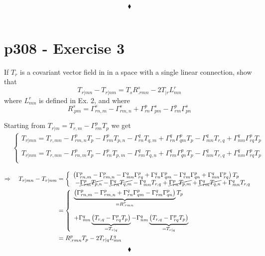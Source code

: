 $$\blacklozenge$$\\
\newpage


\section{p308 - Exercise 3}
\begin{tcolorbox}
If $T_r$ is a covariant vector field in in a space with a single linear connection, show that
 $$ T_{r|mn} - T_{r|nm} = T_s R^s_{.rmn}-2 T_{|r} L^r_{mn}$$
 where $ L^r_{mn}$ is defined in Ex. $2$, and where 
 $$R^s_{.pm} = \Gamma^s_{rn,m} - \Gamma^s_{rm,n} + \Gamma^p_{rn}\Gamma^s_{pm}-\Gamma^p_{rm}\Gamma^s_{pn}$$
\end{tcolorbox}
Starting from $ T_{r|m} = T_{r,m} - \Gamma^p_{rm}T_p$ we get
\begin{align}
&\left\{\begin{array}{l}
T_{r|mn} = T_{r,mn} - \Gamma^p_{rm,n}T_p- \Gamma^p_{rm}T_{p,n} - \Gamma^q_{rn}T_{q,m} + \Gamma^q_{rn}\Gamma^p_{qm}T_{p} - \Gamma^q_{mn}T_{r,q} +  \Gamma^q_{mn}\Gamma^p_{rq}T_{p} \\\\
T_{r|nm} = T_{r,mn} - \Gamma^p_{rn,m}T_p- \Gamma^p_{rn}T_{p,m} - \Gamma^q_{rm}T_{q,n} + \Gamma^q_{rm}\Gamma^p_{qn}T_{p} - \Gamma^q_{nm}T_{r,q} +  \Gamma^q_{nm}\Gamma^p_{rq}T_{p} \\
\end{array}
\right.
\end{align}

\begin{align}
\Rightarrow\quad T_{r|mn} -T_{r|nm} &= \left\{\begin{array}{l}
 \left(\Gamma^p_{rn,m} - \Gamma^p_{rm,n} 
- \Gamma^q_{mn}\Gamma^p_{rq}+ \Gamma^q_{rn}\Gamma^p_{qm}- \Gamma^q_{rm}\Gamma^p_{qn}+  \Gamma^q_{mn}\Gamma^p_{rq}\right)T_p\\\
- \cancel{\Gamma^p_{rm}T_{p,n}} - \cancel{\Gamma^q_{rn}T_{q,m}}  - \Gamma^q_{mn}T_{r,q}   +  \cancel{\Gamma^p_{rn}T_{p,m}} + \cancel{\Gamma^q_{rm}T_{q,n}} + \Gamma^q_{mn}T_{r,q}  \\
\end{array}
\right.\\
&=  \left\{\begin{array}{l}
 \underbrace{\left(\Gamma^p_{rn,m} - \Gamma^p_{rm,n} 
+ \Gamma^q_{rn}\Gamma^p_{qm}- \Gamma^q_{rm}\Gamma^p_{qn}\right)}_{= R^p_{.rmn}}T_p\\\\
 +  \Gamma^q_{mn}\underbrace{\left(T_{r,q}- \Gamma^p_{rq}T_p\right)}_{= T_{r|q}} -  \Gamma^q_{nm}\underbrace{\left(T_{r,q}-\Gamma^p_{rq}T_p\right)}_{= T_{r|q}}
   \\
\end{array}
\right.\\
&= R^p_{.rmn}T_p-2T_{r|q}L^q_{mn}
\end{align}
$$\blacklozenge$$\\
\newpage



